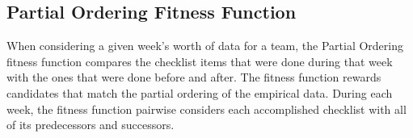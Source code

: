 \documentclass[conference]{IEEEtran}
\begin{document}
\subsection{Partial Ordering Fitness Function}
When considering a given week's worth of data for a team, the Partial Ordering fitness function compares the checklist items that were done during that week with the ones that were done before and after. The fitness function rewards candidates that match the partial ordering of the empirical data. During each week, the fitness function pairwise considers each accomplished checklist with all of its predecessors and successors. 






\end{document}
